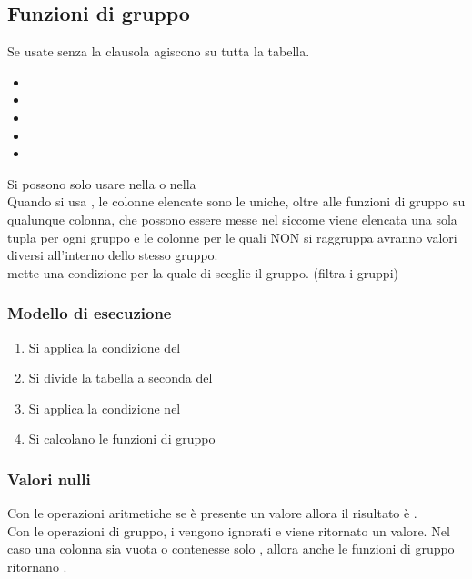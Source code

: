 \subsection{Funzioni di gruppo}
Se usate senza la clausola  agiscono su tutta la tabella.
\begin{itemize}
    \item {}
    \item {}
    \item {}
    \item {}
    \item {}
\end{itemize}
Si possono solo usare nella  o nella \\
Quando si usa , le colonne elencate sono le uniche, oltre alle funzioni di gruppo su qualunque colonna, che possono essere messe nel  siccome viene elencata una sola tupla per ogni gruppo e le colonne per le quali NON si raggruppa avranno valori diversi all'interno dello stesso gruppo.\\
 mette una condizione per la quale di sceglie il gruppo. (filtra i gruppi)
\subsubsection{Modello di esecuzione}
\begin{enumerate}
    \item Si applica la condizione del 
    \item Si divide la tabella a seconda del 
    \item Si applica la condizione nel 
    \item Si calcolano le funzioni di gruppo
\end{enumerate}
\subsubsection{Valori nulli}
Con le operazioni aritmetiche se \`e presente un valore  allora il risultato \`e .\\
Con le operazioni di gruppo, i  vengono ignorati e viene ritornato un valore. Nel caso una colonna sia vuota o contenesse solo , allora anche le funzioni di gruppo ritornano .

